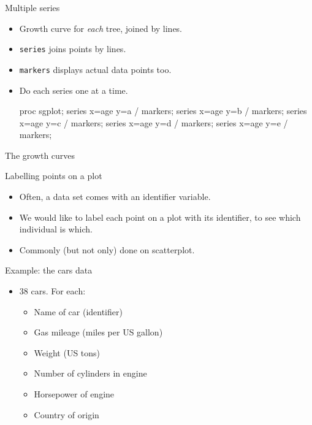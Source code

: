 \documentclass[unknownkeysallowed]{beamer}\usepackage[]{graphicx}\usepackage[]{color}
\begin{document}
\begin{frame}[fragile]{Multiple series}

  \begin{itemize}
  \item Growth curve for \emph{each} tree, joined by lines.
  \item \texttt{series} joins points by lines.
  \item \texttt{markers} displays actual data points too.
  \item Do each series one at a time.
\begin{Sascode}[store=mjd]
proc sgplot;
  series x=age y=a / markers;
  series x=age y=b / markers;
  series x=age y=c / markers;
  series x=age y=d / markers;
  series x=age y=e / markers;
\end{Sascode}
  \end{itemize}
  
\end{frame}

\begin{frame}[fragile]{The growth curves}

  
\end{frame}

\begin{frame}[fragile]{Labelling points on a plot}
  
  \begin{itemize}
    \item Often, a data set comes with an identifier variable.
    \item We would like to label each point on a plot with its
      identifier, to see which individual is which.
    \item Commonly (but not only) done on scatterplot.
  \end{itemize}
  
\end{frame}

\begin{frame}[fragile]{Example: the cars data}
  
  \begin{itemize}
  \item 38 cars. For each: 
    \begin{itemize}
    \item Name of car (identifier)
    \item Gas mileage (miles per US gallon)
    \item Weight (US tons)
    \item Number of cylinders in engine
    \item Horsepower of engine
    \item Country of origin
    \end{itemize}
  \end{itemize}
  
\end{frame}
\end{document}
